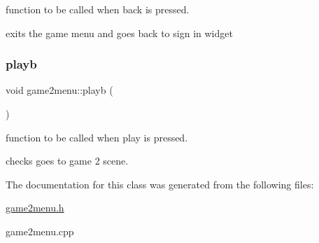 function to be called when back is pressed. 

exits the game menu and goes back to sign in widget \mbox{\label{classgame2menu_a329e5585c0d5c6af4c4f4011efa6878f}} 
\subsubsection{\texorpdfstring{playb}{playb}}
{\footnotesize\ttfamily void game2menu\+::playb (\begin{DoxyParamCaption}{ }\end{DoxyParamCaption})\hspace{0.3cm}{\ttfamily [slot]}}



function to be called when play is pressed. 

checks goes to game 2 scene. 

The documentation for this class was generated from the following files\+:\begin{DoxyCompactItemize}
\item 
\hyperlink{game2menu_8h}{game2menu.\+h}\item 
game2menu.\+cpp\end{DoxyCompactItemize}
